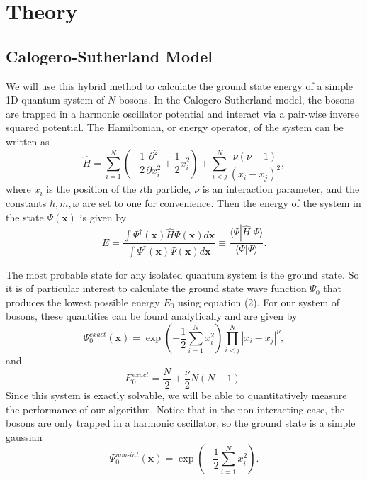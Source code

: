 \documentclass[prb,aps,twocolumn,showpacs,10pt]{revtex4-1}
\begin{document}
\section{Theory}


\subsection{Calogero-Sutherland Model}

We will use this hybrid method to calculate the ground state energy of a simple 1D quantum system of $N$ bosons. In the Calogero-Sutherland model, the bosons are trapped in a harmonic oscillator potential and interact via a pair-wise inverse squared potential. The Hamiltonian, or energy operator, of the system can be written as
\begin{equation}
\hat{H} = \sum_{i=1}^N \left( - \frac{1}{2}\frac{\partial^2}{\partial x_i^2} + \frac{1}{2} x_i^2 \right) + \sum_{i < j}^N \frac{\nu (\nu-1)}{(x_i-x_j)^2},
\end{equation}
where $x_i$ is the position of the $i$th particle, $\nu$ is an interaction parameter, and the constants $\hbar, m, \omega$ are set to one for convenience. Then the energy of the system in the state $\Psi(\bm{x})$ is given by
\begin{equation}
E = \frac{\int \Psi^\dag (\bm{x})\hat{H} \Psi(\bm{x}) d \bm{x} }{\int \Psi^\dag(\bm{x}) \Psi(\bm{x}) d \bm{x} }\equiv \frac{\langle \Psi | \hat{H} | \Psi \rangle}{\langle \Psi |  \Psi \rangle}.
\end{equation}

The most probable state for any isolated quantum system is the ground state. So it is of particular interest to calculate the ground state wave function $\Psi_0$ that produces the lowest possible energy $E_0$ using equation (2). For our system of bosons, these quantities can be found analytically and are given by
\begin{equation}
\Psi_0^{exact} (\bm{x}) = \exp \left( -\frac{1}{2}\sum_{i=1}^N x_i^2 \right) \prod_{i<j}^N | x_i-x_j |^\nu,
\end{equation}
and
\begin{equation}
E_0^{exact} = \frac{N}{2} + \frac{\nu}{2}N(N-1).
\end{equation}
Since this system is exactly solvable, we will be able to quantitatively measure the performance of our algorithm. Notice that in the non-interacting case, the bosons are only trapped in a harmonic oscillator, so the ground state is a simple gaussian
\begin{equation}
\Psi_0^{non\text{-}int} (\bm{x}) = \exp \left( -\frac{1}{2}\sum_{i=1}^N x_i^2 \right).
\end{equation}
\end{document}
